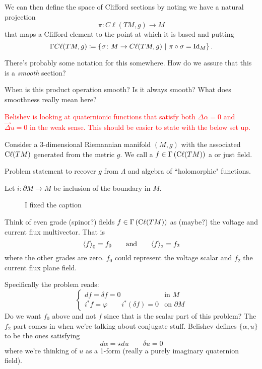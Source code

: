 We can then define the space of Clifford sections by noting we have a natural projection
\[
\pi \colon C\ell(TM,g) \to M
\]
that maps a Clifford element to the point at which it is based and putting
\[
\Gamma C \ell (TM,g) \coloneqq \left\{ \sigma \colon M \to C\ell(TM,g) ~\vert~ \pi \circ \sigma = \mathrm{Id}_M\right\}.
\]
\begin{question}
There's probably some notation for this somewhere. How do we assure that this is a \emph{smooth} section?
\end{question}

\begin{question}
When is this product operation smooth? Is it always smooth? What does smoothness really mean here?
\end{question}

\textcolor{red}{Belishev is looking at quaternionic functions that satisfy both $\Delta \alpha=0$ and $\vec{\Delta}u=0$ in the weak sense. This should be easier to state with the below set up.}

Consider a $3$-dimensional Riemannian manifold $(M,g)$ with the associated  $\mathrm{C}\ell(TM)$ generated from the metric $g$. We call a $f\in \Gamma\left(\mathrm{C}\ell(TM)\right)$ a  or just field.  

\begin{problem}
Problem statement to recover $g$ from $\Lambda$ and algebra of ``holomorphic" functions.
\end{problem}

Let $i\colon \partial M \to M$ be inclusion of the boundary in $M$.


 \begin{figure}[H]
   \centering
   \def\svgwidth{0.75\columnwidth} 
   \resizebox{75mm}{!}{}
   \caption{I fixed the caption}
   \label{fig: broken_caption_is_stupid}
 \end{figure}

Think of even grade (spinor?) fields $f\in \Gamma\left(\mathrm{C}\ell(TM)\right)$ as (maybe?) the voltage and current flux multivector. That is
\[
\projzero{f} = f_0 \qquad \textrm{and} \qquad \projtwo{f}=f_2
\]
where the other grades are zero. $f_0$ could represent the voltage scalar and $f_2$ the current flux plane field.

Specifically the problem reads:
\[
\begin{cases}
df=\delta f = 0 &\textrm{in $M$}\\
i^* f = \varphi \qquad i^*(\delta f)=0 & \textrm{on $\partial M$}
\end{cases}
\]
Do we want $f_0$ above and not $f$ since that is the scalar part of this problem? The $f_2$ part comes in when we're talking about conjugate stuff. Belishev defines  $\{\alpha,u\}$ to be the ones satisfying 
\[
d\alpha = \star d u \qquad \delta u=0
\]
where we're thinking of $u$ as a 1-form (really a purely imaginary quaternion field).

